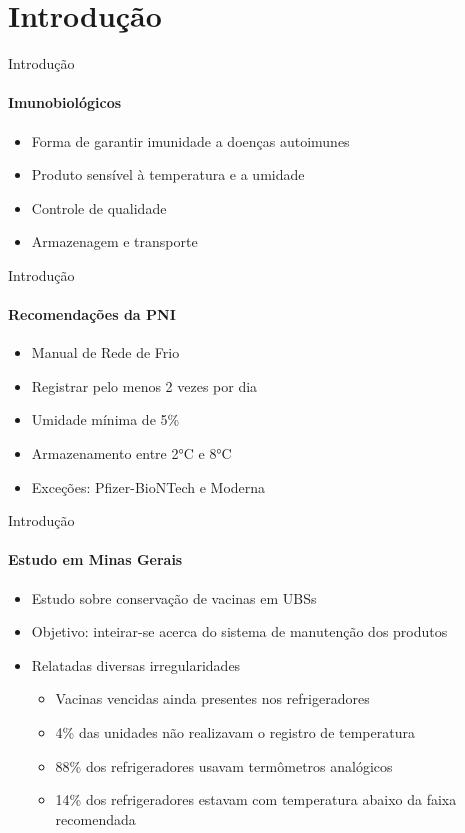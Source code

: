 \section{Introdução}
\begin{frame}{Introdução}
  \framesubtitle{Imunobiológicos}
  
  \begin{itemize}
    \item Forma de garantir imunidade a doenças autoimunes
    \item Produto sensível à temperatura e a umidade
    \item Controle de qualidade
    \item Armazenagem e transporte
  \end{itemize}
\end{frame}

\begin{frame}{Introdução}
  \framesubtitle{Recomendações da PNI}
  
  \begin{itemize}
    \item Manual de Rede de Frio
    \item Registrar pelo menos \alert{2} vezes por dia
    \item Umidade mínima de \alert{5\%}
    \item Armazenamento entre \alert{2°C} e \alert{8°C}
    \item Exceções: Pfizer-BioNTech e Moderna
  \end{itemize}
\end{frame}

\begin{frame}{Introdução}
  \framesubtitle{Estudo em Minas Gerais}
  
  \begin{itemize}
    \item Estudo sobre conservação de vacinas em UBSs
    \item Objetivo: inteirar-se acerca do sistema de manutenção dos produtos
    \item Relatadas diversas irregularidades
    \begin{itemize}
      \item Vacinas vencidas ainda presentes nos refrigeradores
      \item \alert{4\%} das unidades não realizavam o registro de temperatura
      \item \alert{88\%} dos refrigeradores usavam termômetros analógicos
      \item \alert{14\%} dos refrigeradores estavam com temperatura abaixo da faixa recomendada
    \end{itemize}
  \end{itemize}
\end{frame}
